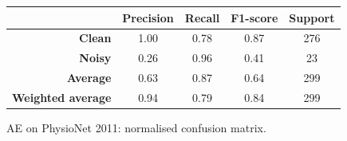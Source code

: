 \documentclass[a4paper,10pt]{article}
\begin{document}
\begin{figure}[p]
{\begin{minipage}{0.6\textwidth}
			\caption{AE on PhysioNet 2011: normalised confusion matrix.}%
			\label{fig:ae_phynet_cm}
		\end{minipage}
	}
	\baselineskip
	\begin{tabular}{r|c|c|c|c}
		\multicolumn{1}{l|}{}     & \textbf{Precision} & \textbf{Recall} & \textbf{F1-score} & \textbf{Support} \\ \midrule
		\textbf{Clean}            & 1.00               & 0.78            & 0.87              & 276              \\
		\textbf{Noisy}            & 0.26               & 0.96            & 0.41              & 23               \\ \midrule
		\textbf{Average}          & 0.63               & 0.87            & 0.64              & 299              \\
		\textbf{Weighted average} & 0.94               & 0.79            & 0.84              & 299
	\end{tabular}
	\label{tab:ae_phynet_cr}
\end{figure}
\end{document}
